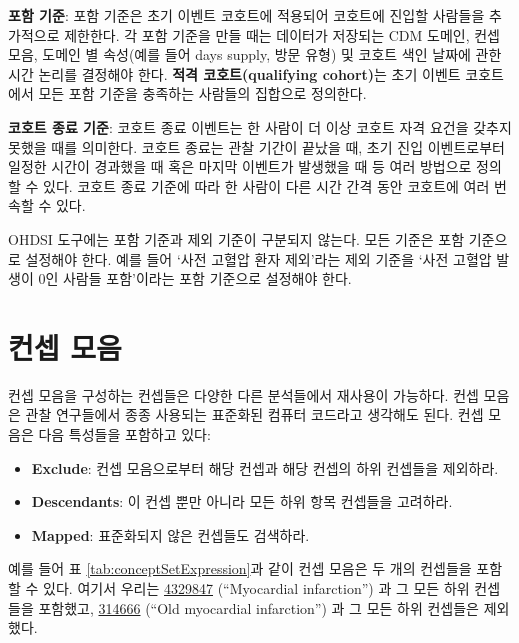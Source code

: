\documentclass[11pt]{book}
\providecommand{\tightlist}{%
  \setlength{\itemsep}{0pt}\setlength{\parskip}{0pt}}
\theoremstyle{definition}
\theoremstyle{definition}
\theoremstyle{definition}
\theoremstyle{remark}
\let\BeginKnitrBlock\begin \let\EndKnitrBlock\end
\begin{document}
\textbf{포함 기준}: 포함 기준은 초기 이벤트 코호트에 적용되어 코호트에
진입할 사람들을 추가적으로 제한한다. 각 포함 기준을 만들 때는 데이터가
저장되는 CDM 도메인, 컨셉 모음, 도메인 별 속성(예를 들어 days supply,
방문 유형) 및 코호트 색인 날짜에 관한 시간 논리를 결정해야 한다.
\textbf{적격 코호트(qualifying cohort)}는 초기 이벤트 코호트에서 모든
포함 기준을 충족하는 사람들의 집합으로 정의한다.

\textbf{코호트 종료 기준}: 코호트 종료 이벤트는 한 사람이 더 이상 코호트
자격 요건을 갖추지 못했을 때를 의미한다. 코호트 종료는 관찰 기간이
끝났을 때, 초기 진입 이벤트로부터 일정한 시간이 경과했을 때 혹은 마지막
이벤트가 발생했을 때 등 여러 방법으로 정의할 수 있다. 코호트 종료 기준에
따라 한 사람이 다른 시간 간격 동안 코호트에 여러 번 속할 수
있다.

\BeginKnitrBlock{rmdimportant}
OHDSI 도구에는 포함 기준과 제외 기준이 구분되지 않는다. 모든 기준은 포함
기준으로 설정해야 한다. 예를 들어 `사전 고혈압 환자 제외'라는 제외
기준을 `사전 고혈압 발생이 0인 사람들 포함'이라는 포함 기준으로 설정해야
한다.
\EndKnitrBlock{rmdimportant}

\section{컨셉 모음}\label{conceptSets}


컨셉 모음을 구성하는 컨셉들은 다양한 다른 분석들에서 재사용이 가능하다.
컨셉 모음은 관찰 연구들에서 종종 사용되는 표준화된 컴퓨터 코드라고
생각해도 된다. 컨셉 모음은 다음 특성들을 포함하고 있다:

\begin{itemize}
\tightlist
\item
  \textbf{Exclude}: 컨셉 모음으로부터 해당 컨셉과 해당 컨셉의 하위
  컨셉들을 제외하라.
\item
  \textbf{Descendants}: 이 컨셉 뿐만 아니라 모든 하위 항목 컨셉들을
  고려하라.
\item
  \textbf{Mapped}: 표준화되지 않은 컨셉들도 검색하라.
\end{itemize}

예를 들어 표 \ref{tab:conceptSetExpression}과 같이 컨셉 모음은 두 개의
컨셉들을 포함할 수 있다. 여기서 우리는
\href{http://athena.ohdsi.org/search-terms/terms/4329847}{4329847}
(``Myocardial infarction'') 과 그 모든 하위 컨셉들을 포함했고,
\href{http://athena.ohdsi.org/search-terms/terms/314666}{314666} (``Old
myocardial infarction'') 과 그 모든 하위 컨셉들은 제외했다.
\end{document}
